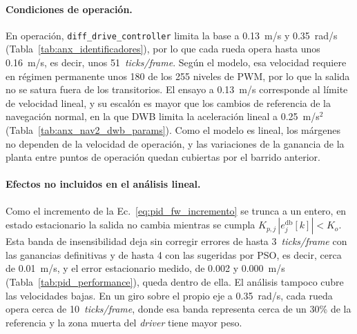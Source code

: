 \begin{appendices}
\paragraph{Condiciones de operación.} En operación,
\texttt{diff\_drive\_controller} limita la base a 0.13~m/s y 0.35~rad/s
(Tabla~\ref{tab:anx_identificadores}), por lo que cada rueda opera hasta unos
0.16~m/s, es decir, unos 51~\textit{ticks/frame}. Según el modelo, esa
velocidad requiere en régimen permanente unos 180 de los 255 niveles de PWM,
por lo que la salida no se satura fuera de los transitorios. El ensayo a
0.13~m/s corresponde al límite de velocidad lineal, y su escalón es mayor que
los cambios de referencia de la navegación normal, en la que DWB limita la
aceleración lineal a 0.25~m/s$^2$ (Tabla~\ref{tab:anx_nav2_dwb_params}). Como
el modelo es lineal, los márgenes no dependen de la velocidad de operación, y
las variaciones de la ganancia de la planta entre puntos de operación quedan
cubiertas por el barrido anterior.

\paragraph{Efectos no incluidos en el análisis lineal.} Como el incremento de
la Ec.~\eqref{eq:pid_fw_incremento} se trunca a un entero, en estado
estacionario la salida no cambia mientras se cumpla
$K_{p,j}\,|e_j^{\mathrm{db}}[k]|<K_o$. Esta banda de insensibilidad deja sin
corregir errores de hasta 3~\textit{ticks/frame} con las ganancias definitivas y
de hasta 4 con las sugeridas por PSO, es decir, cerca de 0.01~m/s, y el error
estacionario medido, de 0.002 y 0.000~m/s (Tabla~\ref{tab:pid_performance}),
queda dentro de ella. El análisis tampoco cubre las velocidades bajas. En un
giro sobre el propio eje a 0.35~rad/s, cada rueda opera cerca de
10~\textit{ticks/frame}, donde esa banda representa cerca de un 30\% de la
referencia y la zona muerta del \textit{driver} tiene mayor peso.


\end{appendices}
